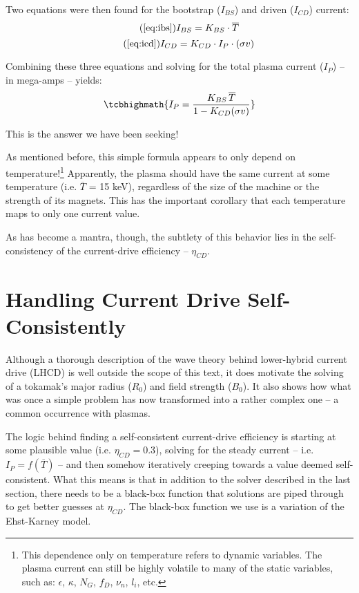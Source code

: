 Two equations were then found for the bootstrap ($I_{BS}$) and driven ($I_{CD}$) current:
\begin{equation}
	\tag{\ref{eq:ibs}}
	I_{BS} = K_{BS} \cdot \overline T
\end{equation}
\begin{equation}
	\tag{\ref{eq:icd}}
	I_{CD} = K_{CD} \cdot I_P \cdot ( \sigma v )
\end{equation}

Combining these three equations and solving for the total plasma current ($I_P$) -- in mega-amps -- yields:
\begin{equation}
	\label{eq:steady}
	\tcbhighmath{
	I_P = \frac{ K_{BS} \, \overline T }{ 1 - K_{CD} ( \sigma v ) }
	}
\end{equation}

This is the answer we have been seeking!

As mentioned before, this simple formula appears to only depend on temperature!\footnote{ This dependence only on temperature refers to dynamic variables. The plasma current can still be highly volatile to many of the static variables, such as: $\epsilon$, $\kappa$, $N_G$, $f_D$, $\nu_n$, $l_i$, etc. } Apparently, the plasma should have the same current at some temperature (i.e. $\overline T$ = 15 keV), regardless of the size of the machine or the strength of its magnets. This has the important corollary that each temperature maps to only one current value. 

As has become a mantra, though, the subtlety of this behavior lies in the self-consistency of the current-drive efficiency -- $\eta_{CD}$.

\section{Handling Current Drive Self-Consistently}

Although a thorough description of the wave theory behind lower-hybrid current drive (LHCD) is well outside the scope of this text, it does motivate the solving of a tokamak's major radius ($R_0$) and field strength ($B_0$). It also shows how what was once a simple problem has now transformed into a rather complex one -- a common occurrence with plasmas.

The logic behind finding a self-consistent current-drive efficiency is starting at some plausible value (i.e. $\eta_{CD} = 0.3$), solving for the steady current -- i.e. $I_P = f(\overline T)$ -- and then somehow iteratively creeping towards a value deemed self-consistent. What this means is that in addition to the solver described in the last section, there needs to be a black-box function that solutions are piped through to get better guesses at $\eta_{CD}$. The black-box function we use is a variation of the Ehst-Karney model. \cite{ehstkarney}


